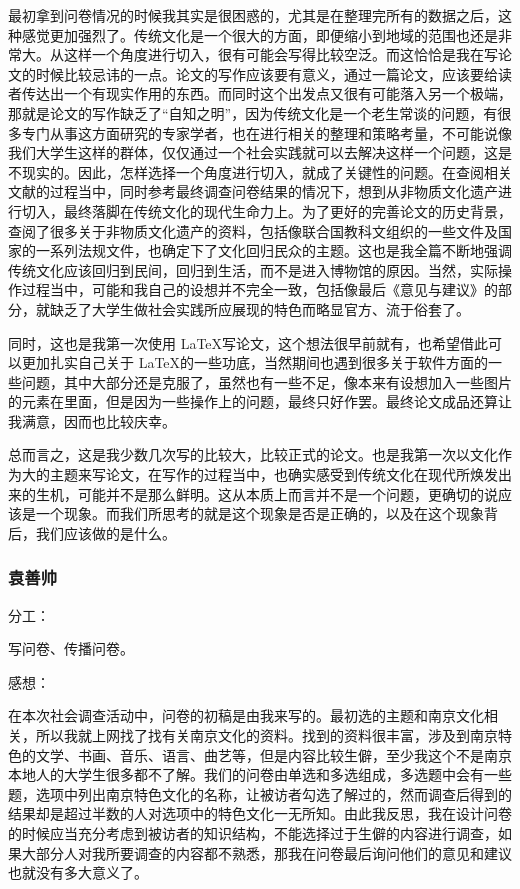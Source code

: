 \documentclass[12pt]{article}%
\begin{document}
最初拿到问卷情况的时候我其实是很困惑的，尤其是在整理完所有的数据之后，这种感觉更加强烈了。传统文化是一个很大的方面，即便缩小到地域的范围也还是非常大。从这样一个角度进行切入，很有可能会写得比较空泛。而这恰恰是我在写论文的时候比较忌讳的一点。论文的写作应该要有意义，通过一篇论文，应该要给读者传达出一个有现实作用的东西。而同时这个出发点又很有可能落入另一个极端，那就是论文的写作缺乏了“自知之明”，因为传统文化是一个老生常谈的问题，有很多专门从事这方面研究的专家学者，也在进行相关的整理和策略考量，不可能说像我们大学生这样的群体，仅仅通过一个社会实践就可以去解决这样一个问题，这是不现实的。因此，怎样选择一个角度进行切入，就成了关键性的问题。在查阅相关文献的过程当中，同时参考最终调查问卷结果的情况下，想到从非物质文化遗产进行切入，最终落脚在传统文化的现代生命力上。为了更好的完善论文的历史背景，查阅了很多关于非物质文化遗产的资料，包括像联合国教科文组织的一些文件及国家的一系列法规文件，也确定下了文化回归民众的主题。这也是我全篇不断地强调传统文化应该回归到民间，回归到生活，而不是进入博物馆的原因。当然，实际操作过程当中，可能和我自己的设想并不完全一致，包括像最后《意见与建议》的部分，就缺乏了大学生做社会实践所应展现的特色而略显官方、流于俗套了。

同时，这也是我第一次使用 \LaTeX 写论文，这个想法很早前就有，也希望借此可以更加扎实自己关于 \LaTeX 的一些功底，当然期间也遇到很多关于软件方面的一些问题，其中大部分还是克服了，虽然也有一些不足，像本来有设想加入一些图片的元素在里面，但是因为一些操作上的问题，最终只好作罢。最终论文成品还算让我满意，因而也比较庆幸。

总而言之，这是我少数几次写的比较大，比较正式的论文。也是我第一次以文化作为大的主题来写论文，在写作的过程当中，也确实感受到传统文化在现代所焕发出来的生机，可能并不是那么鲜明。这从本质上而言并不是一个问题，更确切的说应该是一个现象。而我们所思考的就是这个现象是否是正确的，以及在这个现象背后，我们应该做的是什么。


\subsubsection{袁善帅}
分工：

写问卷、传播问卷。

感想：

在本次社会调查活动中，问卷的初稿是由我来写的。最初选的主题和南京文化相关，所以我就上网找了找有关南京文化的资料。找到的资料很丰富，涉及到南京特色的文学、书画、音乐、语言、曲艺等，但是内容比较生僻，至少我这个不是南京本地人的大学生很多都不了解。我们的问卷由单选和多选组成，多选题中会有一些题，选项中列出南京特色文化的名称，让被访者勾选了解过的，然而调查后得到的结果却是超过半数的人对选项中的特色文化一无所知。由此我反思，我在设计问卷的时候应当充分考虑到被访者的知识结构，不能选择过于生僻的内容进行调查，如果大部分人对我所要调查的内容都不熟悉，那我在问卷最后询问他们的意见和建议也就没有多大意义了。
\end{document}
